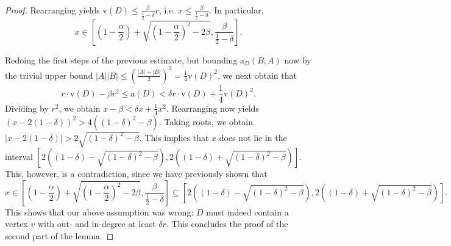 \documentclass[10pt,a4paper]{amsart}
\begin{document}
\begin{proof}
Rearranging yields $\mathrm{v}(D)\le \frac{\beta}{\frac{1}{2}-\delta}r$, i.e. $x\le \frac{\beta}{\frac{1}{2}-\delta}$. In particular, $$x\in \left[\left(1-\frac{\alpha}{2}\right)+\sqrt{\left(1-\frac{\alpha}{2}\right)^2-2\beta},\frac{\beta}{\frac{1}{2}-\delta}\right].$$

Redoing the first steps of the previous estimate, but bounding $\mathrm{a}_D(B,A)$ now by the trivial upper bound $|A||B|\le \left(\frac{|A|+|B|}{2}\right)^2=\frac{1}{4}\mathrm{v}(D)^2$, we next obtain that
$$r\cdot \mathrm{v}(D)-\beta r^2\le \mathrm{a}(D)< \delta r\cdot \mathrm{v}(D)+\frac{1}{4}\mathrm{v}(D)^2.$$
Dividing by $r^2$, we obtain $x-\beta< \delta x+\frac{1}{4}x^2$. Rearranging now yields $(x-2(1-\delta))^2>4((1-\delta)^2-\beta)$. Taking roots, we obtain $|x-2(1-\delta)|>2\sqrt{(1-\delta)^2-\beta}$. This implies that $x$ does not lie in the interval $[2((1-\delta)-\sqrt{(1-\delta)^2-\beta}),2((1-\delta)+\sqrt{(1-\delta)^2-\beta})]$. This, however, is a contradiction, since we have previously shown that $$x\in \left[\left(1-\frac{\alpha}{2}\right)+\sqrt{\left(1-\frac{\alpha}{2}\right)^2-2\beta},\frac{\beta}{\frac{1}{2}-\delta}\right]\subseteq [2((1-\delta)-\sqrt{(1-\delta)^2-\beta}),2((1-\delta)+\sqrt{(1-\delta)^2-\beta})].$$ This shows that our above assumption was wrong: $D$ must indeed contain a vertex $v$ with out- and in-degree at least $\delta r$. This concludes the proof of the second part of the lemma. 
\end{proof}
\end{document}

